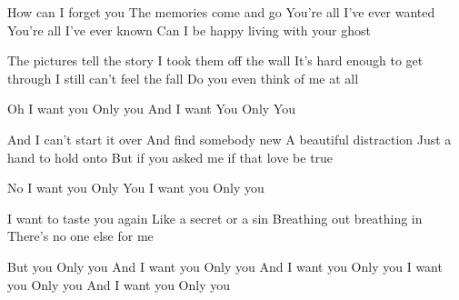 \resetVars%
%
%
\makeheader%
\lyrics%
How can I forget you
The memories come and go
You're all I've ever wanted
You're all I've ever known
Can I be happy living with your ghost

The pictures tell the story
I took them off the wall
It's hard enough to get through
I still can't feel the fall
Do you even think of me at all

Oh I want you
Only you
And I want You
Only You

And I can't start it over
And find somebody new
A beautiful distraction
Just a hand to hold onto
But if you asked me if that love be true

No I want you
Only You
I want you
Only you

I want to taste you again
Like a secret or a sin
Breathing out breathing in
There's no one else for me

But you
Only you
And I want you
Only you
And I want you
Only you
I want you
Only you
And I want you
Only you
\next

